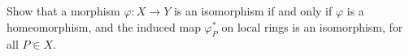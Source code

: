 Show that a morphism $\varphi: X \to Y$ is an isomorphism if and only if $\varphi$ is a homeomorphism, and the induced map $\varphi_P^*$ on local rings is an isomorphism, for all $P \in X$.
